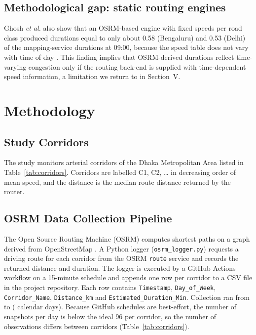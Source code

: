 \documentclass[conference]{IEEEtran}
\begin{document}
\subsection{Methodological gap: static routing engines}
Ghosh \emph{et al.} also show that an OSRM-based engine with fixed speeds per road class produced durations equal to only about 0.58 (Bengaluru) and 0.53 (Delhi) of the mapping-service durations at 09:00, because the speed table does not vary with time of day \cite{ghosh2020eco}. This finding implies that OSRM-derived durations reflect time-varying congestion only if the routing back-end is supplied with time-dependent speed information, a limitation we return to in Section~V.

\section{Methodology}
\subsection{Study Corridors}
The study monitors \NCorr{} arterial corridors of the Dhaka Metropolitan Area listed in Table~\ref{tab:corridors}. Corridors are labelled C1, C2, \dots{} in decreasing order of mean speed, and the distance is the median route distance returned by the router.



\subsection{OSRM Data Collection Pipeline}
The Open Source Routing Machine (OSRM) computes shortest paths on a graph derived from OpenStreetMap \cite{luxen2011real}. A Python logger (\texttt{osrm\_logger.py}) requests a driving route for each corridor from the OSRM \texttt{route} service and records the returned distance and duration. The logger is executed by a GitHub Actions workflow on a 15-minute schedule and appends one row per corridor to a CSV file in the project repository. Each row contains \texttt{Timestamp}, \texttt{Day\_of\_Week}, \texttt{Corridor\_Name}, \texttt{Distance\_km} and \texttt{Estimated\_Duration\_Min}. Collection ran from \DateStart{} to \DateEnd{} (\NDays{} calendar days). Because GitHub schedules are best-effort, the number of snapshots per day is below the ideal 96 per corridor, so the number of observations differs between corridors (Table~\ref{tab:corridors}).
\end{document}
